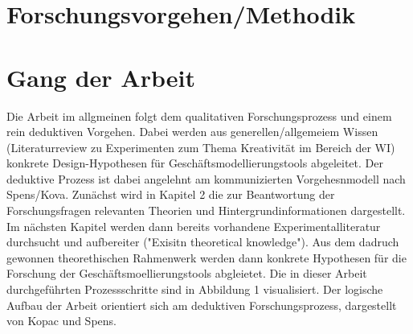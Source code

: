 \section{Forschungsvorgehen/Methodik}




\section{Gang der Arbeit}
Die Arbeit im allgmeinen folgt dem qualitativen Forschungsprozess und einem rein deduktiven Vorgehen. Dabei werden aus generellen/allgemeiem Wissen (Literaturreview zu Experimenten zum Thema Kreativität im Bereich der WI) konkrete Design-Hypothesen für Geschäftsmodellierungstools abgeleitet. Der deduktive Prozess ist dabei angelehnt am kommunizierten Vorgehesnmodell nach Spens/Kova.
Zunächst wird in Kapitel 2 die zur Beantwortung der Forschungsfragen relevanten Theorien und Hintergrundinformationen dargestellt. Im nächsten Kapitel werden dann bereits vorhandene Experimentalliteratur durchsucht und aufbereiter ("Exisitn theoretical knowledge"). Aus dem dadruch gewonnen theorethischen Rahmenwerk werden dann konkrete Hypothesen für die Forschung der Geschäftsmoellierungstools abgleietet. Die in dieser Arbeit durchgeführten Prozessschritte sind in Abbildung 1 visualisiert. 
Der logische Aufbau der Arbeit orientiert sich am deduktiven Forschungsprozess, dargestellt von Kopac und Spens. 

